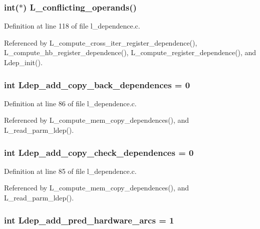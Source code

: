 \subsubsection{\setlength{\rightskip}{0pt plus 5cm}int($\ast$) \bf{L\_\-conflicting\_\-operands}()}\label{l__dependence_8c_507f61fb8d90e2f65ee21c892edfd751}




Definition at line 118 of file l\_\-dependence.c.

Referenced by L\_\-compute\_\-cross\_\-iter\_\-register\_\-dependence(), L\_\-compute\_\-hb\_\-register\_\-dependence(), L\_\-compute\_\-register\_\-dependence(), and Ldep\_\-init().
\subsubsection{\setlength{\rightskip}{0pt plus 5cm}int \bf{Ldep\_\-add\_\-copy\_\-back\_\-dependences} = 0}\label{l__dependence_8c_5a733f573abfa56183923d73e702e3fa}




Definition at line 86 of file l\_\-dependence.c.

Referenced by L\_\-compute\_\-mem\_\-copy\_\-dependences(), and L\_\-read\_\-parm\_\-ldep().
\subsubsection{\setlength{\rightskip}{0pt plus 5cm}int \bf{Ldep\_\-add\_\-copy\_\-check\_\-dependences} = 0}\label{l__dependence_8c_3b6a79265e7f6e3d9c377ba070bd16c3}




Definition at line 85 of file l\_\-dependence.c.

Referenced by L\_\-compute\_\-mem\_\-copy\_\-dependences(), and L\_\-read\_\-parm\_\-ldep().
\subsubsection{\setlength{\rightskip}{0pt plus 5cm}int \bf{Ldep\_\-add\_\-pred\_\-hardware\_\-arcs} = 1}\label{l__dependence_8c_259b270f9c50760af7af5f0ad374fdff}




